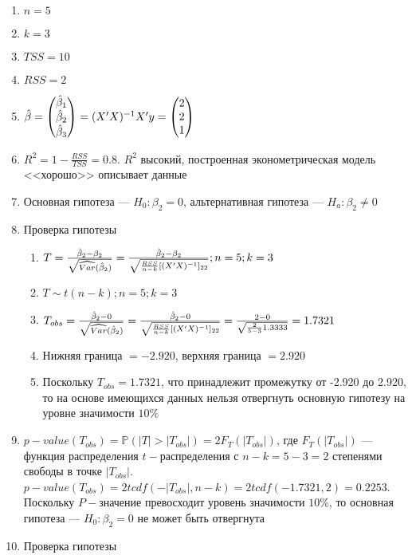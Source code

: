 \documentclass[pdftex,11pt,openany]{book}\usepackage[]{graphicx}\usepackage[]{color}
\begin{document}
\begin{solution}
\begin{enumerate}
\item $n = 5$
\item $k = 3$
\item $TSS = 10$
\item $RSS = 2$
\item $\hat{\beta} = \begin{pmatrix} \hat{\beta}_1 \\ \hat{\beta}_2 \\ \hat{\beta}_3 \end{pmatrix} = (X'X)^{-1}X'y = \begin{pmatrix} 2 \\ 2 \\ 1 \end{pmatrix}$
\item $R^2 = 1 - \frac {RSS}{TSS} = 0.8.$ $R^2$ высокий, построенная эконометрическая модель <<хорошо>> описывает данные
\item Основная гипотеза --- $H_0: \beta_2 = 0$, альтернативная гипотеза --- $H_a: \beta_2 \not= 0$
\item Проверка гипотезы
\begin{enumerate}
\item $T = \frac{\hat{\beta}_2 - \beta_2}{\sqrt{\widehat{Var}(\hat{\beta}_2)}} = \frac {\hat{\beta}_2 - \beta_2}{\sqrt{{\frac{RSS}{n-k}}[(X'X)^{-1}]_{22}}}; n = 5; k = 3$
\item $T \sim t(n-k); n = 5; k = 3$
\item $T_{obs} = \frac{\hat{\beta}_2 - 0}{\sqrt{\widehat{Var}(\hat{\beta}_2)}} = \frac {\hat{\beta}_2 - 0}{\sqrt{{\frac{RSS}{n-k}}[(X'X)^{-1}]_{22}}} = \frac{2-0}{\sqrt{{\frac{2}{5-3}}1.3333}} = 1.7321$
\item Нижняя граница $= -2.920$, верхняя граница $= 2.920$
\item Поскольку $T_{obs} = 1.7321$, что принадлежит промежутку от -2.920 до 2.920, то на основе имеющихся данных нельзя отвергнуть основную гипотезу на уровне значимости $10\%$
\end{enumerate}
\item $p-value(T_{obs}) = \mathbb{P}(|T|>|T_{obs}|) = 2F_{T}(|T_{obs}|)$, где $F_{T}(|T_{obs}|)$ --- функция распределения $t-$распределения с $n - k = 5 - 3 = 2$ степенями свободы в точке $|T_{obs}|$. $p-value(T_{obs}) = 2tcdf(-|T_{obs}|, n - k) = 2tcdf(-1.7321,2) = 0.2253$. Поскольку $P-$значение превосходит уровень значимости $10\%$, то основная гипотеза --- $H_0: \beta_2 = 0$ не может быть отвергнута
\item Проверка гипотезы

\end{enumerate}
\end{solution}
\end{document}
